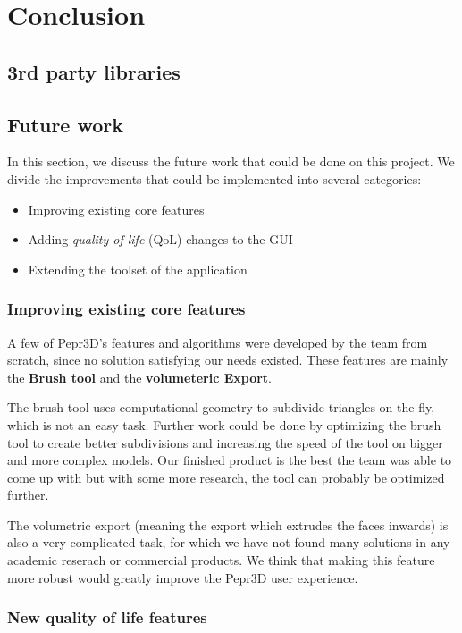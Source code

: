 \chapter{Conclusion}

\section{3rd party libraries}

\section{Future work}

In this section, we discuss the future work that could be done on this project. We divide the improvements that could be implemented into several categories:

\begin{itemize}
\item Improving existing core features
\item Adding \textit{quality of life} (QoL) changes to the GUI
\item Extending the toolset of the application
\end{itemize}

\subsection{Improving existing core features}

A few of Pepr3D's features and algorithms were developed by the team from scratch, since no solution satisfying our needs existed. These features are mainly the \textbf{Brush tool} and the \textbf{volumeteric Export}. 

The brush tool uses computational geometry to subdivide triangles on the fly, which is not an easy task. Further work could be done by optimizing the brush tool to create better subdivisions and increasing the speed of the tool on bigger and more complex models. Our finished product is the best the team was able to come up with but with some more research, the tool can probably be optimized further.

The volumetric export (meaning the export which extrudes the faces inwards) is also a very complicated task, for which we have not found many solutions in any academic reserach or commercial products. We think that making this feature more robust would greatly improve the Pepr3D user experience.

\subsection{New quality of life features}

